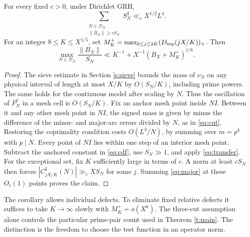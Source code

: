\documentclass[11pt,a4paper]{article}
\begin{document}
\begin{cor}\label{c:op}
For every fixed \(c>0\), under Dirichlet GRH,
\[
 \sum_{\substack{N\in\mathcal D_X\\\|B_N\|\ge cS_N}}S_N^2\ll_c X^{1/2}L^4 .
\]
For an integer \(8\le K\le X^{1/5}\), set \(M_K^+=\max_{0\le j\le2K}(D_{{\mathrm{sep}}}(jX/K))_+\). Then
\[
 \max_{N\in\mathcal D_X}\frac{\|B_N\|}{S_N}
 \ll K^{-1}+X^{-1}(B_X+M_K^+)^{1/6}.
\]
\end{cor}
\begin{proof}
The sieve estimate in Section \ref{s:sieve} bounds the mass of \(\nu_N\) on any physical interval of length at most \(X/K\) by \(O(S_N/K)\), including prime powers. The same holds for the continuous model after scaling by \(N\). Thus the oscillation of \(P_N^*\) in a mesh cell is \(O(S_N/K)\). Fix an anchor mesh point inside \(NI\). Between it and any other mesh point in \(NI\), the signed mass is given by minus the difference of the minor- and major-arc errors divided by \(N\), as in \eqref{eq:cut}. Restoring the coprimality condition costs \(O(L^3/N)\), by summing over \(m=p^k\) with \(p\mid N\). Every point of \(NI\) lies within one step of an interior mesh point. Subtract the anchored constant in \eqref{eq:cdf}, use \(S_N\gg1\), and apply \eqref{eq:transfer}. For the exceptional set, fix \(K\) sufficiently large in terms of \(c\). A norm at least \(cS_N\) then forces \(|C_{jX/K}^\sharp(N)|\gg_c XS_N\) for some \(j\). Summing \eqref{eq:major} at these \(O_c(1)\) points proves the claim.
\end{proof}
The corollary allows individual defects. To eliminate fixed relative defects it suffices to take \(K\to\infty\) slowly with \(M_K^+=o(X^6)\). The three-cut assumption alone controls the particular prime-pair count used in Theorem \ref{t:main}. The distinction is the freedom to choose the test function in an operator norm.
\end{document}
